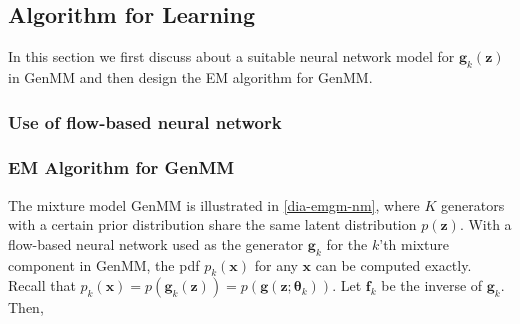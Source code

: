 \subsection{Algorithm for Learning}
In this section we first discuss about a suitable neural network model for $\bm{g}_k(\bm{z})$ in GenMM and then design the EM algorithm for GenMM. 

\subsubsection{Use of flow-based neural network}\label{subsec-flow-intro}



\subsubsection{EM Algorithm for GenMM}
\label{sec-algo-genmm}
The mixture model GenMM is illustrated in \autoref{dia-emgm-nm},
where $K$ generators with a certain prior distribution share the same
latent distribution $p(\bm{z})$. With a flow-based neural network used as the generator $\bm{g}_k$ for the $k$'th mixture component in GenMM, the pdf $p_k(\bm{x})$ for any
$\bm{x}$ can be computed exactly. Recall that $p_k(\bm{x}) =  p(\bm{g}_k(\bm{z})) =p(\bm{g}(\bm{z};\bm{\theta}_k))$. Let $\bm{f}_k$ be the inverse of $\bm{g}_k$. Then, %
